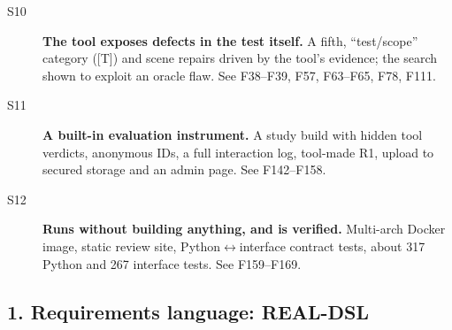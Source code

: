 \begin{description}
\item[S10] \textbf{The tool exposes defects in the test itself.} A fifth, ``test/scope'' category ([T]) and scene repairs driven by the tool's evidence; the search shown to exploit an oracle flaw. See F38--F39, F57, F63--F65, F78, F111.
\item[S11] \textbf{A built-in evaluation instrument.} A study build with hidden tool verdicts, anonymous IDs, a full interaction log, tool-made R1, upload to secured storage and an admin page. See F142--F158.
\item[S12] \textbf{Runs without building anything, and is verified.} Multi-arch Docker image, static review site, Python$\leftrightarrow$interface contract tests, about 317 Python and 267 interface tests. See F159--F169.
\end{description}

\subsection*{1. Requirements language: REAL-DSL}

